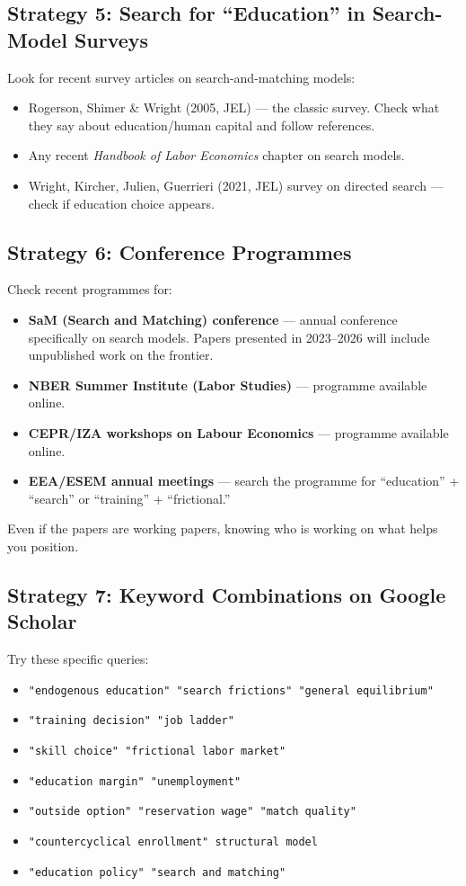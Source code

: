\documentclass[12pt]{article}
\begin{document}
\subsection{Strategy 5: Search for ``Education'' in Search-Model Surveys}

Look for recent survey articles on search-and-matching models:
\begin{itemize}
    \item Rogerson, Shimer \& Wright (2005, JEL) --- the classic survey. Check what they say about education/human capital and follow references.
    \item Any recent \emph{Handbook of Labor Economics} chapter on search models.
    \item Wright, Kircher, Julien, Guerrieri (2021, JEL) survey on directed search --- check if education choice appears.
\end{itemize}

\subsection{Strategy 6: Conference Programmes}

Check recent programmes for:
\begin{itemize}
    \item \textbf{SaM (Search and Matching) conference} --- annual conference specifically on search models. Papers presented in 2023--2026 will include unpublished work on the frontier.
    \item \textbf{NBER Summer Institute (Labor Studies)} --- programme available online.
    \item \textbf{CEPR/IZA workshops on Labour Economics} --- programme available online.
    \item \textbf{EEA/ESEM annual meetings} --- search the programme for ``education'' + ``search'' or ``training'' + ``frictional.''
\end{itemize}
Even if the papers are working papers, knowing who is working on what helps you position.

\subsection{Strategy 7: Keyword Combinations on Google Scholar}

Try these specific queries:
\begin{itemize}
    \item \texttt{"endogenous education" "search frictions" "general equilibrium"}
    \item \texttt{"training decision" "job ladder"}
    \item \texttt{"skill choice" "frictional labor market"}
    \item \texttt{"education margin" "unemployment"}
    \item \texttt{"outside option" "reservation wage" "match quality"}
    \item \texttt{"countercyclical enrollment" structural model}
    \item \texttt{"education policy" "search and matching"}
\end{itemize}
\end{document}
